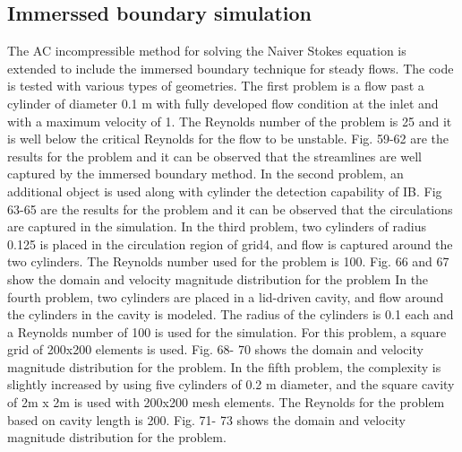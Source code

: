 \documentclass[12pt]{elsarticle}
\begin{document}
	\subsection{Immerssed boundary simulation}
	The AC incompressible method for solving the Naiver Stokes equation is extended to include the immersed boundary technique for steady flows. The code is tested with various types of geometries. The first problem is a  flow past a cylinder of diameter 0.1 m with fully developed flow condition at the inlet and with a maximum velocity of 1. The Reynolds number of the problem is 25 and it is well below the critical Reynolds for the flow to be unstable. Fig. 59-62 are the results for the problem and it can be observed that the streamlines are well captured by the immersed boundary method.\newline
	\newline
	In the second problem, an additional object is used along with cylinder the detection capability of IB. Fig 63-65 are the results for the problem and it can be observed that the circulations are captured in the simulation.\newline
	\newline
	In the third problem, two cylinders of radius 0.125 is placed in the circulation region of grid4, and flow is captured around the two cylinders. The Reynolds number used for the problem is 100. Fig. 66 and 67 show the domain and velocity magnitude distribution for the problem\newline
	\newline
	In the fourth problem, two cylinders are placed in a lid-driven cavity, and flow around the cylinders in the cavity is modeled. The radius of the cylinders is 0.1 each and a Reynolds number of 100 is used for the simulation. For this problem, a square grid of 200x200 elements is used. Fig. 68- 70 shows the domain and velocity magnitude distribution for the problem.\newline
	\newline
	In the fifth problem, the complexity is slightly increased by using five cylinders of 0.2 m diameter, and the square cavity of 2m x 2m  is used with 200x200 mesh elements. The Reynolds for the problem based on cavity length is 200. Fig. 71- 73 shows the domain and velocity magnitude distribution for the problem.\
	
\end{document}

